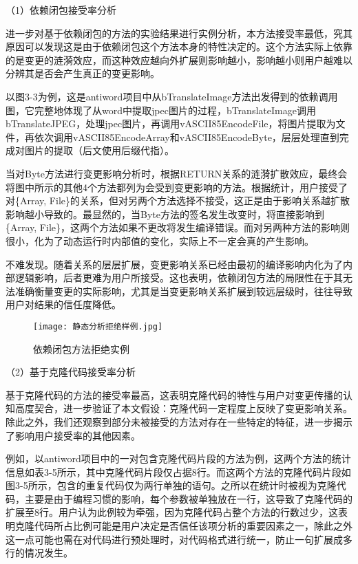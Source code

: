 （1）依赖闭包接受率分析

进一步对基于依赖闭包的方法的实验结果进行实例分析，本方法接受率最低，究其原因可以发现这是由于依赖闭包这个方法本身的特性决定的。这个方法实际上依靠的是变更的涟漪效应，而这种效应越向外扩展则影响越小，影响越小则用户越难以分辨其是否会产生真正的变更影响。

以图3-3为例，这是antiword项目中从bTranslateImage方法出发得到的依赖调用图，它完整地体现了从word中提取jpec图片的过程，bTranslateImage调用bTranslateJPEG，处理jpec图片，再调用vASCII85EncodeFile，将图片提取为文件，再依次调用vASCII85EncodeArray和vASCII85EncodeByte，层层处理直到完成对图片的提取（后文使用后缀代指）。

当对Byte方法进行变更影响分析时，根据RETURN关系的涟漪扩散效应，最终会将图中所示的其他4个方法都列为会受到变更影响的方法。根据统计，用户接受了对\{Array, File\}的关系，但对另两个方法选择不接受，这正是由于影响关系越扩散影响越小导致的。最显然的，当Byte方法的签名发生改变时，将直接影响到\{Array, File\}，这两个方法如果不更改将发生编译错误。而对另两种方法的影响则很小，化为了动态运行时内部值的变化，实际上不一定会真的产生影响。

不难发现。随着关系的层层扩展，变更影响关系已经由最初的编译影响内化为了内部逻辑影响，后者更难为用户所接受。这也表明，依赖闭包方法的局限性在于其无法准确衡量变更的实际影响，尤其是当变更影响关系扩展到较远层级时，往往导致用户对结果的信任度降低。

\begin{figure}[h]
\centering
\texttt{[image: 静态分析拒绝样例.jpg]}
\caption{依赖闭包方法拒绝实例}
\end{figure}

（2）基于克隆代码接受率分析

基于克隆代码的方法的接受率最高，这表明克隆代码的特性与用户对变更传播的认知高度契合，进一步验证了本文假设：克隆代码一定程度上反映了变更影响关系。除此之外，我们还观察到部分未被接受的方法对存在一些特定的特征，进一步揭示了影响用户接受率的其他因素。

例如，以antiword项目中的一对包含克隆代码片段的方法为例，这两个方法的统计信息如表3-5所示，其中克隆代码片段仅占据8行。而这两个方法的克隆代码片段如图3-5所示，包含的重复代码仅为两行单独的语句。之所以在统计时被视为克隆代码，主要是由于编程习惯的影响，每个参数被单独放在一行，这导致了克隆代码的扩展至8行。用户认为此例较为牵强，因为克隆代码占整个方法的行数过少，这表明克隆代码所占比例可能是用户决定是否信任该项分析的重要因素之一，除此之外这一点可能也需在对代码进行预处理时，对代码格式进行统一，防止一句扩展成多行的情况发生。

